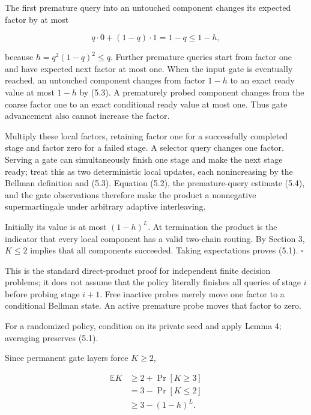 \documentclass[11pt,a4paper]{article}
\begin{document}
The first premature query into an untouched component changes its expected factor by at most


\begin{equation}
                 q\cdot0+(1-q)\cdot1
                         =1-q\le1-h,
\tag{5.4}
\end{equation}

because \(h=q^2(1-q)^2\le q\).  Further premature queries start from factor one and have expected next factor at most one.  When the input gate is eventually reached, an untouched component changes from factor \(1-h\) to an exact ready value at most \(1-h\) by (5.3).  A prematurely probed component changes from the coarse factor one to an exact conditional ready value at most one.  Thus gate advancement also cannot increase the factor.


Multiply these local factors, retaining factor one for a successfully completed stage and factor zero for a failed stage.  A selector query changes one factor.  Serving a gate can simultaneously finish one stage and make the next stage ready; treat this as two deterministic local updates, each nonincreasing by the Bellman definition and (5.3). Equation (5.2), the premature-query estimate (5.4), and the gate observations therefore make the product a nonnegative supermartingale under arbitrary adaptive interleaving.


Initially its value is at most \((1-h)^L\).  At termination the product is the indicator that every local component has a valid two-chain routing. By Section 3, \(K\le2\) implies that all components succeeded.  Taking expectations proves (5.1). \(\square\)


This is the standard direct-product proof for independent finite decision problems; it does not assume that the policy literally finishes all queries of stage \(i\) before probing stage \(i+1\).  Free inactive probes merely move one factor to a conditional Bellman state.  An active premature probe moves that factor to zero.


For a randomized policy, condition on its private seed and apply Lemma 4; averaging preserves (5.1).


Since permanent gate layers force \(K\ge2\),


\begin{equation}
\begin{aligned}
\mathbb E K
 &\ge2+\Pr[K\ge3]\\
 &=3-\Pr[K\le2]\\
 &\ge3-(1-h)^L.
\end{aligned}
\tag{5.5}
\end{equation}
\end{document}
